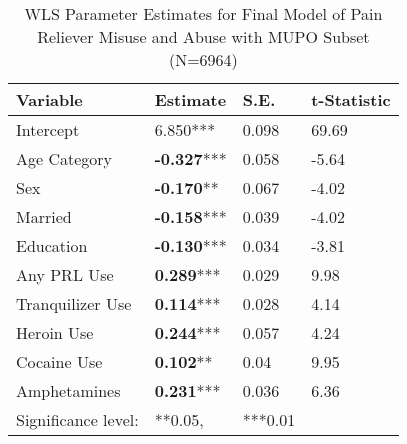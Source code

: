 \documentclass[sigconf]{acmart}
\begin{document}
\begin{table}
  \caption{WLS Parameter Estimates for Final Model of Pain Reliever Misuse and Abuse 
  with MUPO Subset (N=6964)}
  \label{tab:freq}
  \begin{tabular}{llll}
    \toprule
    Variable & Estimate& S.E.& t-Statistic \\
    \midrule
    Intercept& 6.850***& 0.098& 69.69 \\
    Age Category& \textbf{-0.327}***& 0.058& -5.64 \\
    Sex& \textbf{-0.170}**& 0.067& -4.02 \\
    Married& \textbf{-0.158}***& 0.039& -4.02 \\
    Education& \textbf{-0.130}***& 0.034& -3.81 \\
    Any PRL Use& \textbf{0.289}***& 0.029& 9.98 \\
    Tranquilizer Use& \textbf{0.114}***& 0.028& 4.14 \\
    Heroin Use& \textbf{0.244}***& 0.057& 4.24 \\
    Cocaine Use& \textbf{0.102}**& 0.04& 9.95 \\
    Amphetamines& \textbf{0.231}***& 0.036& 6.36 \\
    \bottomrule
    Significance level:& **0.05,& ***0.01&
  \end{tabular}
\end{table}






\end{document}
